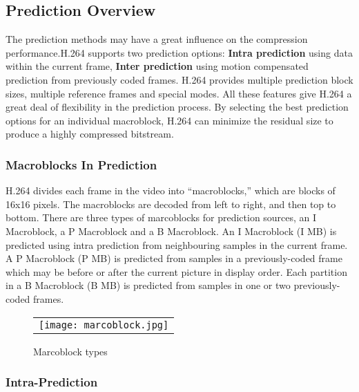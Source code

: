 \documentclass[../main.tex]{subfiles}
\begin{document}
\subsection{Prediction Overview}

The prediction methods may have a great influence on the compression performance.H.264 supports two prediction options: \textbf{Intra prediction} using data within
the current frame, \textbf{Inter prediction} using motion compensated prediction from previously
coded frames. H.264 provides multiple prediction block sizes, multiple reference frames and special modes. All these features give H.264 a great deal of flexibility in the prediction process. By selecting the best prediction options for an individual macroblock, H.264 can minimize the residual size to produce a highly compressed bitstream.



\subsubsection{ Macroblocks In Prediction }

H.264 divides each frame in the video into “macroblocks,” which are blocks of 16x16
pixels. The macroblocks are decoded from left to right, and then top to bottom. There are three types of marcoblocks for prediction sources, an I Macroblock, a P Macroblock and a B Macroblock. An I Macroblock (I MB) is predicted using intra prediction from
neighbouring samples in the current frame. A P Macroblock (P MB) is predicted from samples
in a previously-coded frame which may be before or after the current picture in display order.  Each partition in a B Macroblock (B MB) is
predicted from samples in one or two previously-coded frames.

  \begin{figure} [ht]
   \begin{center}
   \begin{tabular}{c} %
   \texttt{[image: marcoblock.jpg]}
   \end{tabular}
   \end{center}
   \caption[mbtypes] 
   { \label{fig:mbtypes} Marcoblock types }
   \end{figure}     %

\subsubsection{ Intra-Prediction }
\end{document}
